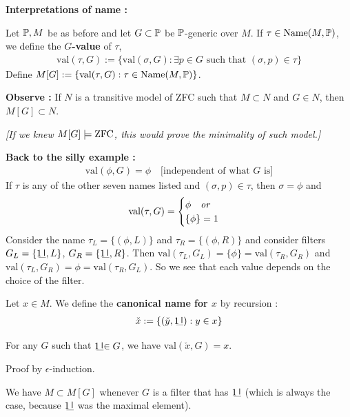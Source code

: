 \documentclass[12pt,a4paper]{article}
\newenvironment{proof}
{\begin{changemargin}{0.5cm}{0.5cm} 
	}%
	{\end{changemargin}
}
\newenvironment{p}
{\begin{proof} 
	}%
	{\end{proof}
}
\begin{document}
\textbf{Interpretations of name :}

 Let $\mathbb{P}, M$ be as before and let $G\subset \mathbb{P}$ be $\mathbb{P}$-generic over $M$. If $\tau \in \text{Name}(M, \mathbb{P})$, we define the \textbf{$G$-value} of $\tau$,
\begin{align*}
\text{val}(\tau, G) := \{\text{val}(\sigma, G) : \exists p \in G \text{ such that }(\sigma, p)\in \tau \}
\end{align*}
Define $M[G] : = \{\text{val}(\tau, G) : \tau \in \text{Name}(M, \mathbb{P}) \}$.
\s

\textbf{Observe : } If $N$ is a transitive model of ZFC such that $M\subset N$ and $G \in N$, then $M[G]\subset N$.

\emph{[If we knew $M[G] \models \text{ZFC}$, this would prove the minimality of such model.]}
\s

\textbf{Back to the silly example :}
\begin{align*}
\text{val} (\phi, G) = \phi \quad \text{[independent of what } G \text{ is}]
\end{align*}
If $\tau$ is any of the other seven names listed and $(\sigma, p) \in \tau$, then $\sigma = \phi$ and
\begin{align*}
\text{val}(\tau, G) = \begin{cases}
\phi \quad \emph{or}\\
\{\phi \} = 1
\end{cases}
\end{align*}
Consider the name $\tau_L = \{(\phi, L)\}$ and $\tau_R = \{(\phi, R) \}$ and consider filters $G_L = \{\charac, L\}$, $G_R =\{\charac, R\}$. Then $\text{val}(\tau_L, G_L) = \{\phi \} = \text{val}(\tau_R, G_R)$ and $\text{val}(\tau_L, G_R) = \phi = \text{val}(\tau_R, G_L)$. So we see that each value depends on the choice of the filter.
\s

 Let $x \in M$. We define the \textbf{canonical name for $x$} by recursion : 
\begin{align*}
\check{x} := \{(\check{y}, \charac) : y\in x\}
\end{align*}

\prop For any $G$ such that $\charac \in G$, we have $\text{val}(\check{x}, G) = x$.
\begin{p}
\pf Proof by $\epsilon$-induction.
\end{p}
\s

\corr We have $M\subset M[G]$ whenever $G$ is a filter that has $\charac$ (which is always the case, because $\charac$ was the maximal element).
\s
\end{document}

